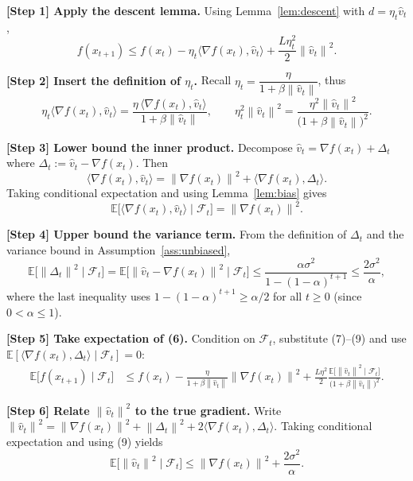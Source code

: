 \documentclass{article}
\newcommand{\E}{\mathbb{E}}
\newcommand{\norm}[1]{\left\lVert #1\right\rVert}
\begin{document}
\bigskip
\noindent\textbf{[Step 1] Apply the descent lemma.}  
Using Lemma~\ref{lem:descent} with $d=\eta_t\hat v_t$,
\[
f(x_{t+1})\le f(x_t)-\eta_t\langle\nabla f(x_t),\hat v_t\rangle+\frac{L\eta_t^2}{2}\norm{\hat v_t}^2. \tag{6}
\]

\noindent\textbf{[Step 2] Insert the definition of $\eta_t$.}  
Recall $\eta_t=\dfrac{\eta}{1+\beta\norm{\hat v_t}}$, thus
\[
\eta_t\langle\nabla f(x_t),\hat v_t\rangle
= \frac{\eta\,\langle\nabla f(x_t),\hat v_t\rangle}{1+\beta\norm{\hat v_t}} ,
\qquad
\eta_t^2\norm{\hat v_t}^2
= \frac{\eta^2\norm{\hat v_t}^2}{\bigl(1+\beta\norm{\hat v_t}\bigr)^2}. \tag{7}
\]

\noindent\textbf{[Step 3] Lower bound the inner product.}  
Decompose $\hat v_t=\nabla f(x_t)+\Delta_t$ where $\Delta_t:=\hat v_t-\nabla f(x_t)$. Then
\[
\langle\nabla f(x_t),\hat v_t\rangle=\norm{\nabla f(x_t)}^2+\langle\nabla f(x_t),\Delta_t\rangle .
\]
Taking conditional expectation and using Lemma~\ref{lem:bias} gives
\[
\E\!\bigl[\langle\nabla f(x_t),\hat v_t\rangle\mid\mathcal{F}_t\bigr]
= \norm{\nabla f(x_t)}^2 . \tag{8}
\]

\noindent\textbf{[Step 4] Upper bound the variance term.}  
From the definition of $\Delta_t$ and the variance bound in Assumption~\ref{ass:unbiased},
\[
\E\!\bigl[\norm{\Delta_t}^2\mid\mathcal{F}_t\bigr]
= \E\!\bigl[\norm{\hat v_t-\nabla f(x_t)}^2\mid\mathcal{F}_t\bigr]
\le \frac{\alpha\sigma^2}{1-(1-\alpha)^{t+1}} \le \frac{2\sigma^2}{\alpha}, \tag{9}
\]
where the last inequality uses $1-(1-\alpha)^{t+1}\ge\alpha/2$ for all $t\ge0$ (since $0<\alpha\le1$).

\noindent\textbf{[Step 5] Take expectation of (6).}  
Condition on $\mathcal{F}_t$, substitute (7)–(9) and use $\E[\langle\nabla f(x_t),\Delta_t\rangle\mid\mathcal{F}_t]=0$:
\[
\begin{aligned}
\E\!\bigl[f(x_{t+1})\mid\mathcal{F}_t\bigr]
&\le f(x_t)-\frac{\eta}{1+\beta\norm{\hat v_t}}\norm{\nabla f(x_t)}^2
+\frac{L\eta^2}{2}\frac{\E\!\bigl[\norm{\hat v_t}^2\mid\mathcal{F}_t\bigr]}
{\bigl(1+\beta\norm{\hat v_t}\bigr)^2}. \tag{10}
\end{aligned}
\]

\noindent\textbf{[Step 6] Relate $\norm{\hat v_t}^2$ to the true gradient.}  
Write $\norm{\hat v_t}^2=\norm{\nabla f(x_t)}^2+ \norm{\Delta_t}^2+2\langle\nabla f(x_t),\Delta_t\rangle$.  
Taking conditional expectation and using (9) yields
\[
\E\!\bigl[\norm{\hat v_t}^2\mid\mathcal{F}_t\bigr]
\le \norm{\nabla f(x_t)}^2+\frac{2\sigma^2}{\alpha}. \tag{11}
\]
\end{document}
